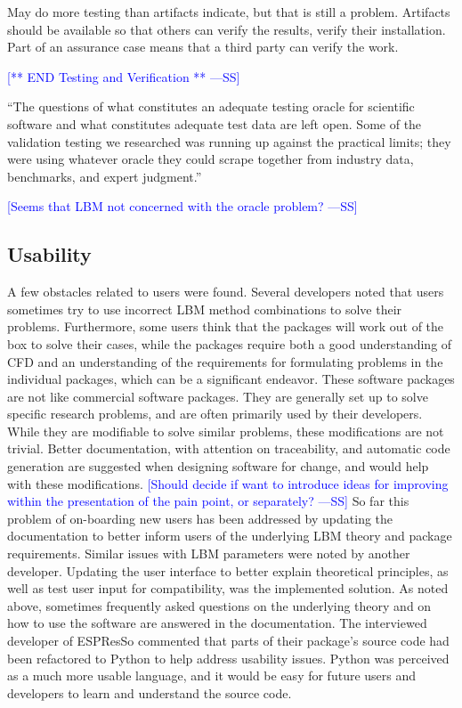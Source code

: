\documentclass[final, 3p, times, authoryear]{elsarticle}
\newcommand{\authornote}[3]{\textcolor{#1}{[#3 ---#2]}}
\newcommand{\authornote}[3]{}
\newcommand{\wss}[1]{\authornote{blue}{SS}{#1}} %
\begin{document}
May do more testing than artifacts indicate, but that is still a problem.
Artifacts should be available so that others can verify the results, verify
their installation.  Part of an assurance case means that a third party can
verify the work.

\wss{** END Testing and Verification **}

``The questions of what constitutes an adequate testing oracle for scientific software and what constitutes adequate test data are left open. Some of the validation testing we researched was running up against the practical limits; they were using whatever oracle they could scrape together from industry data, benchmarks, and expert judgment.'' \citep{KellyAndSanders2008}

\wss{Seems that LBM not concerned with the oracle problem?}

\subsection{Usability}

A few obstacles related to users were found. Several developers noted that users
sometimes try to use incorrect LBM method combinations to solve their problems.
Furthermore, some users think that the packages will work out of the box to
solve their cases, while the packages require both a good understanding of CFD
and an understanding of the requirements for formulating problems in the
individual packages, which can be a significant endeavor. These software
packages are not like commercial software packages. They are generally set up to
solve specific research problems, and are often primarily used by their
developers. While they are modifiable to solve similar problems, these
modifications are not trivial. Better documentation, with attention on
traceability, and automatic code generation are suggested when designing
software for change, and would help with these modifications. \wss{Should decide
if want to introduce ideas for improving within the presentation of the pain
point, or separately?}  So far this problem of on-boarding new users has been
addressed by updating the documentation to better inform users of the underlying
LBM theory and package requirements. Similar issues with LBM parameters were
noted by another developer. Updating the user interface to better explain
theoretical principles, as well as test user input for compatibility, was the
implemented solution. As noted above, sometimes frequently asked questions on
the underlying theory and on how to use the software are answered in the
documentation.  The interviewed developer of ESPResSo commented that parts of
their package's source code had been refactored to Python to help address
usability issues. Python was perceived as a much more usable language, and it
would be easy for future users and developers to learn and understand the source
code. 
\end{document}
